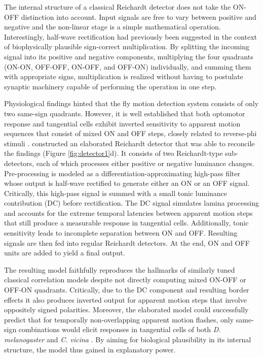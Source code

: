 The internal structure of a classical Reichardt detector does not take the ON-OFF distinction into account. Input signals are free to vary between positive and negative and the non-linear stage is a simple mathematical operation. Interestingly, half-wave rectification had previously been suggested in the context of biophysically plausible sign-correct multiplication. By splitting the incoming signal into its positive and negative components, multiplying the four quadrants (ON-ON, OFF-OFF, ON-OFF, and OFF-ON) individually, and summing them with appropriate signs, multiplication is realized without having to postulate synaptic machinery capable of performing the operation in one step.

Physiological findings hinted that the fly motion detection system consists of only two same-sign quadrants. However, it is well established that both optomotor response and tangential cells exhibit inverted sensitivity to apparent motion sequences that consist of mixed ON and OFF steps, closely related to reverse-phi stimuli \citep{Hassenstein:1956fa,Egelhaaf:1992wh,Clark:2011gw}. \citet{Eichner:2011ic} constructed an elaborated Reichardt detector that was able to reconcile the findings  (Figure \ref{fig:detector1}d). It consists of two Reichardt-type sub-detectors, each of which processes either positive or negative luminance changes. Pre-processing is modeled as a differentiation-approximating high-pass filter whose output is half-wave rectified to generate either an ON or an OFF signal. Critically, this high-pass signal is summed with a small tonic luminance contribution (DC) before rectification. The DC signal simulates lamina processing \citep{Kern:2000a} and accounts for the extreme temporal latencies between apparent motion steps that still produce a measurable response in tangential cells. Additionally, tonic sensitivity leads to incomplete separation between ON and OFF. Resulting signals are then fed into regular Reichardt detectors. At the end, ON and OFF units are added to yield a final output.

The resulting model faithfully reproduces the hallmarks of similarly tuned classical correlation models despite not directly computing mixed ON-OFF or OFF-ON quadrants. Critically, due to the DC component and resulting border effects it also produces inverted output for apparent motion steps that involve oppositely signed polarities. Moreover, the elaborated model could successfully predict that for temporally non-overlapping apparent motion flashes, only same-sign combinations would elicit responses in tangential cells of both \textit{D. melanogaster} and \textit{C. vicina} \citep[see also][]{Franceschini:1989aa}. By aiming for biological plausibility in its internal structure, the model thus gained in explanatory power.

